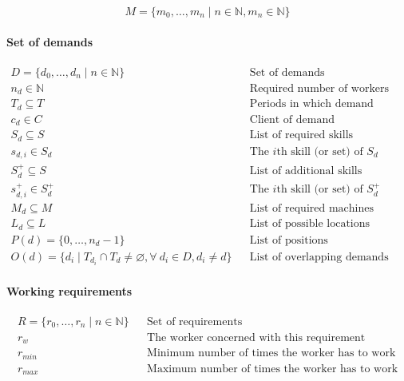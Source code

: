 \documentclass[../../thesis.tex]{subfiles}
\begin{document}
\begin{equation*}
  M = \{ m_0, \dots, m_n \mid n \in \mathbb{N}, m_n \in \mathbb{N} \}
\end{equation*}


\paragraph{Set of demands}

\begin{align*}
  D = \{ d_0, \dots, d_n \mid n \in \mathbb{N} \} && \text{Set of demands} \\
  n_d \in \mathbb{N} && \text{Required number of workers} \\ 
  T_d \subseteq T && \text{Periods in which demand occurs} \\ 
  c_d \in C && \text{Client of demand} \\ 
  S_d \subseteq S && \text{List of required skills} \\
  s_{d,i} \in S_d && \text{The $i$th skill (or set) of $S_d$} \\ 
  S^{+}_d \subseteq S && \text{List of additional skills} \\ 
  s^{+}_{d,i} \in S^{+}_d && \text{The $i$th skill (or set) of $S^{+}_d$} \\ 
  M_d \subseteq M && \text{List of required machines} \\ 
  L_d \subseteq L && \text{List of possible locations} \\
  P(d) = \{ 0, \dots, n_d - 1 \} && \text{List of positions} \\
  O(d) = \{ d_i \mid T_{d_i} \cap T_d \neq \varnothing, \forall \ d_i \in D, d_i \neq d \} && \text{List of overlapping demands}
\end{align*}

\paragraph{Working requirements}

\begin{align*}
    R = \{ r_0, \dots, r_n \mid n \in \mathbb{N} \} && \text{Set of requirements} \\ 
    r_{w}   && \text{The worker concerned with this requirement} \\
    r_{min} && \text{Minimum number of times the worker has to work} \\
    r_{max} && \text{Maximum number of times the worker has to work}
\end{align*}
\end{document}
